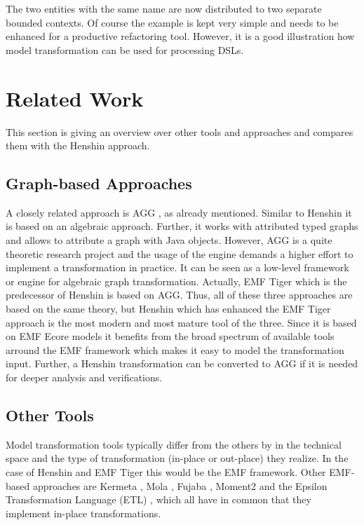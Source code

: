 \documentclass[runningheads]{llncs}
\begin{document}
\noindent
The two entities with the same name are now distributed to two separate bounded contexts. Of course the example is kept very simple and needs to be enhanced for a productive refactoring tool. However, it is a good illustration how model transformation can be used for processing DSLs.

\section{Related Work}\label{tools}
This section is giving an overview over other tools and approaches and compares them with the Henshin approach.

\subsection{Graph-based Approaches}
A closely related approach is AGG \cite{agg}, as already mentioned. Similar to Henshin it is based on an algebraic approach. Further, it works with attributed typed graphs and allows to attribute a graph with Java objects. However, AGG \cite{agg} is a quite theoretic research project and the usage of the engine demands a higher effort to implement a transformation in practice. It can be seen as a low-level framework or engine for algebraic graph transformation. Actually, EMF Tiger \cite{emf-tiger} which is the predecessor of Henshin is based on AGG. Thus, all of these three approaches are based on the same theory, but Henshin which has enhanced the EMF Tiger approach is the most modern and most mature tool of the three. Since it is based on EMF Ecore models it benefits from the broad spectrum of available tools arround the EMF framework which makes it easy to model the transformation input. Further, a Henshin transformation can be converted to AGG if it is needed for deeper analysis and verifications.

\subsection{Other Tools}
Model transformation tools typically differ from the others by in the technical space and the type of transformation (in-place or out-place) they realize. In the case of Henshin \cite{Arendt:2010:HAC:1926458.1926471} and EMF Tiger \cite{emf-tiger} this would be the EMF framework. Other EMF-based approaches are Kermeta \cite{kermeta}, Mola \cite{mola}, Fujaba \cite{fujaba}, Moment2 \cite{moment2} and the Epsilon Transformation Language (ETL) \cite{etl}, which all have in common that they implement in-place transformations. 
\end{document}
